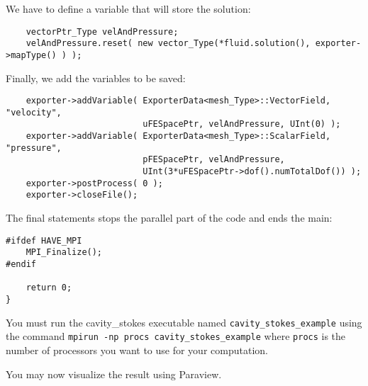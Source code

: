 We have to define a variable that will store the solution:
\begin{verbatim}
    vectorPtr_Type velAndPressure;
    velAndPressure.reset( new vector_Type(*fluid.solution(), exporter->mapType() ) );
\end{verbatim}

Finally, we add the variables to be saved:
\begin{verbatim}
    exporter->addVariable( ExporterData<mesh_Type>::VectorField, "velocity", 
                           uFESpacePtr, velAndPressure, UInt(0) );
    exporter->addVariable( ExporterData<mesh_Type>::ScalarField, "pressure", 
                           pFESpacePtr, velAndPressure, 
                           UInt(3*uFESpacePtr->dof().numTotalDof()) );
    exporter->postProcess( 0 );
    exporter->closeFile();
\end{verbatim}

The final statements stops the parallel part of the code and ends the main:
\begin{verbatim}
#ifdef HAVE_MPI
    MPI_Finalize();
#endif

    return 0;
}
\end{verbatim}

You must run the cavity\_stokes executable named \verb!cavity_stokes_example! using the command
\verb!mpirun -np procs cavity_stokes_example! where \verb!procs! is the number 
of processors you want to use for your computation.

You may now visualize the result using Paraview.


%
%
%
%
%


